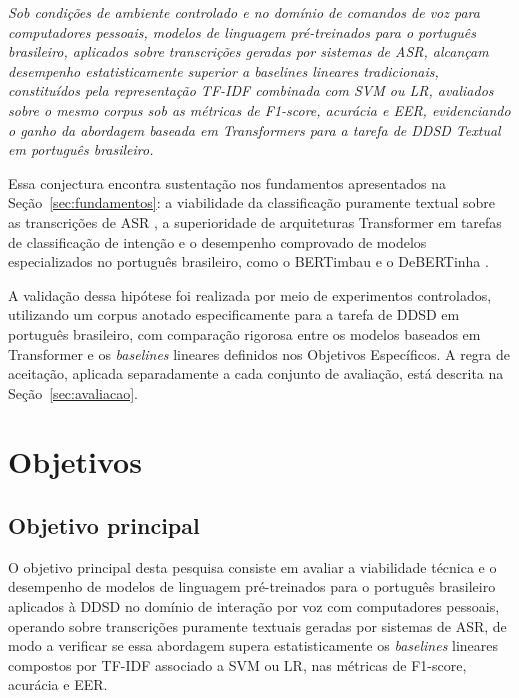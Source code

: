 \documentclass[
    12pt,                %
    openright,           %
    oneside,             %
    a4paper,             %
    english,             %
    brazil               %
]{abntex2}
\begin{document}
\textit{Sob condições de ambiente controlado e no domínio de comandos de voz para computadores pessoais, modelos de linguagem pré-treinados para o português brasileiro, aplicados sobre transcrições geradas por sistemas de ASR, alcançam desempenho estatisticamente superior a baselines lineares tradicionais, constituídos pela representação TF-IDF combinada com SVM ou LR, avaliados sobre o mesmo corpus sob as métricas de F1-score, acurácia e EER, evidenciando o ganho da abordagem baseada em Transformers para a tarefa de DDSD Textual em português brasileiro.}

Essa conjectura encontra sustentação nos fundamentos apresentados na Seção~\ref{sec:fundamentos}: a viabilidade da classificação puramente textual sobre as transcrições de ASR \cite{Wagner2024}, a superioridade de arquiteturas Transformer em tarefas de classificação de intenção \cite{Weld2023} e o desempenho comprovado de modelos especializados no português brasileiro, como o BERTimbau \cite{Souza2020} e o DeBERTinha \cite{Campiotti2023}. 

A validação dessa hipótese foi realizada por meio de experimentos controlados, utilizando um corpus anotado especificamente para a tarefa de DDSD em português brasileiro, com comparação rigorosa entre os modelos baseados em Transformer e os \textit{baselines} lineares definidos nos Objetivos Específicos. A regra de aceitação, aplicada separadamente a cada conjunto de avaliação, está descrita na Seção~\ref{sec:avaliacao}.

\section{Objetivos}
\label{sec:objetivos}

\subsection{Objetivo principal}

O objetivo principal desta pesquisa consiste em avaliar a viabilidade técnica e o desempenho de modelos de linguagem pré-treinados para o português brasileiro aplicados à DDSD no domínio de interação por voz com computadores pessoais, operando sobre transcrições puramente textuais geradas por sistemas de ASR, de modo a verificar se essa abordagem supera estatisticamente os \textit{baselines} lineares compostos por TF-IDF associado a SVM ou LR, nas métricas de F1-score, acurácia e EER.
\end{document}
